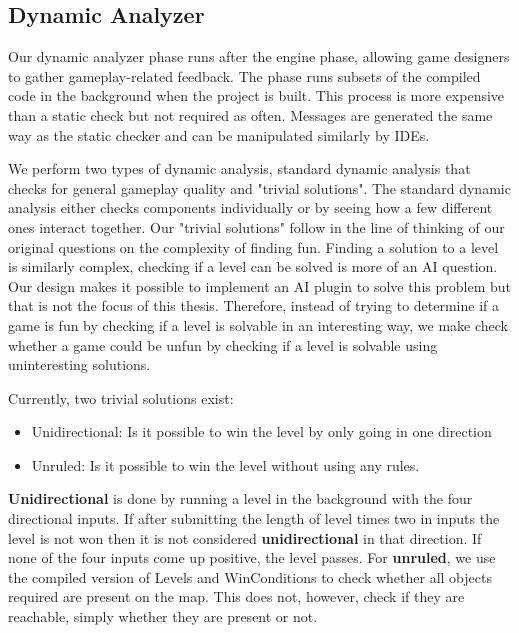 \subsection{Dynamic Analyzer}
Our dynamic analyzer phase runs after the engine phase, allowing game designers to gather gameplay-related feedback. The phase runs subsets of the compiled code in the background when the project is built. This process is more expensive than a static check but not required as often. Messages are generated the same way as the static checker and can be manipulated similarly by IDEs.

We perform two types of dynamic analysis, standard dynamic analysis that checks for general gameplay quality and "trivial solutions". The standard dynamic analysis either checks components individually or by seeing how a few different ones interact together. Our "trivial solutions" follow in the line of thinking of our original questions on the complexity of finding fun. Finding a solution to a level is similarly complex, checking if a level can be solved is more of an AI question. Our design makes it possible to implement an AI plugin to solve this problem but that is not the focus of this thesis. Therefore, instead of trying to determine if a game is fun by checking if a level is solvable in an interesting way, we make check whether a game could be unfun by checking if a level is solvable using uninteresting solutions.

Currently, two trivial solutions exist:
\begin{itemize}
    \item Unidirectional: Is it possible to win the level by only going in one direction
    \item Unruled: Is it possible to win the level without using any rules.
\end{itemize}

\textbf{Unidirectional} is done by running a level in the background with the four directional inputs. If after submitting the length of level times two in inputs the level is not won then it is not considered \textbf{unidirectional} in that direction. If none of the four inputs come up positive, the level passes. For \textbf{unruled}, we use the compiled version of Levels and WinConditions to check whether all objects required are present on the map. This does not, however, check if they are reachable, simply whether they are present or not. 

